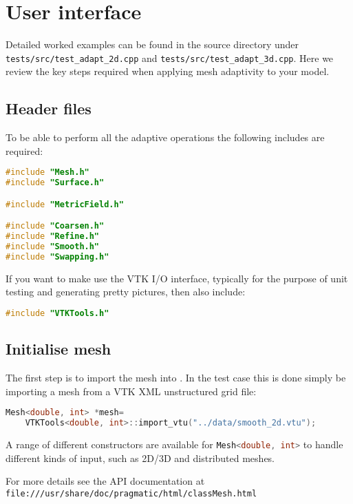 \chapter{User interface}

Detailed worked examples can be found in the source directory under
\lstinline[language=bash]+tests/src/test_adapt_2d.cpp+ and
\lstinline[language=bash]+tests/src/test_adapt_3d.cpp+. Here we
review the key steps required when applying mesh adaptivity to your
model.

\section{Header files}
To be able to perform all the adaptive operations the following
includes are required:
\begin{lstlisting}[language=C++]
#include "Mesh.h"
#include "Surface.h"

#include "MetricField.h"

#include "Coarsen.h"
#include "Refine.h"
#include "Smooth.h"
#include "Swapping.h"
\end{lstlisting}

If you want to make use the VTK I/O interface, typically for the
purpose of unit testing and generating pretty pictures, then also
include:
\begin{lstlisting}[language=C++]
#include "VTKTools.h"
\end{lstlisting}

\section{Initialise mesh}
The first step is to import the mesh into \pragmatic. In the test case
this is done simply be importing a mesh from a VTK XML unstructured
grid file:
\begin{lstlisting}[language=C++]
  Mesh<double, int> *mesh=
    VTKTools<double, int>::import_vtu("../data/smooth_2d.vtu");
\end{lstlisting}
A range of different constructors are available for
\lstinline[language=c++]+Mesh<double, int>+ to handle different kinds of input, such as 2D/3D and distributed meshes. 

For more details see the API documentation at
\lstinline[language=html]+file:///usr/share/doc/pragmatic/html/classMesh.html+

